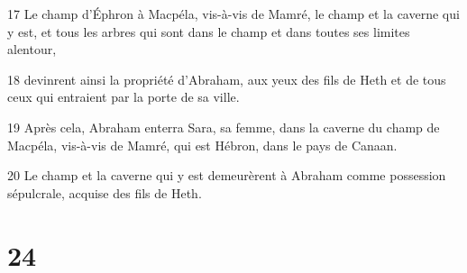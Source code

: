 \par 17 Le champ d'Éphron à Macpéla, vis-à-vis de Mamré, le champ et la caverne qui y est, et tous les arbres qui sont dans le champ et dans toutes ses limites alentour,
\par 18 devinrent ainsi la propriété d'Abraham, aux yeux des fils de Heth et de tous ceux qui entraient par la porte de sa ville.
\par 19 Après cela, Abraham enterra Sara, sa femme, dans la caverne du champ de Macpéla, vis-à-vis de Mamré, qui est Hébron, dans le pays de Canaan.
\par 20 Le champ et la caverne qui y est demeurèrent à Abraham comme possession sépulcrale, acquise des fils de Heth.

\chapter{24}

